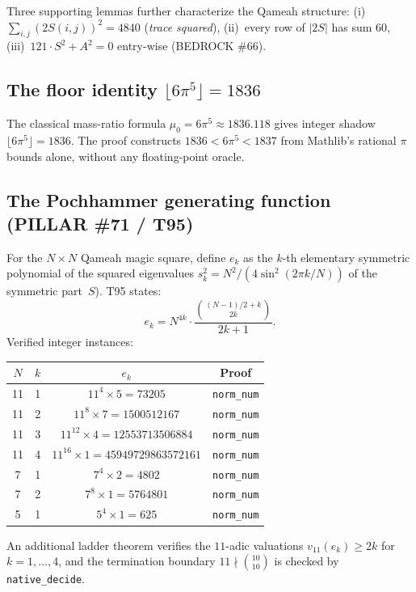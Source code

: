 \documentclass[11pt,a4paper]{article}
\begin{document}
Three supporting lemmas further characterize the Qameah structure:
(i)~$\sum_{i,j}(2S(i,j))^2 = 4840$ (\textit{trace squared}),
(ii)~every row of $|2S|$ has sum 60,
(iii)~$121\cdot S^2 + A^2 = 0$ entry-wise (BEDROCK \#66).

\subsection{The floor identity $\lfloor 6\pi^5\rfloor = 1836$}

The classical mass-ratio formula $\mu_0=6\pi^5\approx 1836.118$ gives
integer shadow $\lfloor 6\pi^5\rfloor = 1836$.  The proof constructs
$1836 < 6\pi^5 < 1837$ from Mathlib's rational $\pi$ bounds alone,
without any floating-point oracle.

\subsection{The Pochhammer generating function (PILLAR \#71 / T95)}

For the $N\times N$ Qameah magic square, define $e_k$ as the $k$-th
elementary symmetric polynomial of the
squared eigenvalues $s_k^2 = N^2/(4\sin^2(2\pi k/N))$ of the symmetric
part~$S$).  T95 states:
\[
  e_k = N^{4k}\cdot \frac{\binom{(N-1)/2+k}{2k}}{2k+1}.
\]
Verified integer instances:

\begin{center}
\begin{tabular}{cccc}
\toprule
$N$ & $k$ & $e_k$ & Proof \\
\midrule
11 & 1 & $11^4 \times 5 = 73205$ & \texttt{norm\_num} \\
11 & 2 & $11^8 \times 7 = 1500512167$ & \texttt{norm\_num} \\
11 & 3 & $11^{12}\times 4 = 12553713506884$ & \texttt{norm\_num} \\
11 & 4 & $11^{16}\times 1 = 45949729863572161$ & \texttt{norm\_num} \\
7  & 1 & $7^4 \times 2 = 4802$ & \texttt{norm\_num} \\
7  & 2 & $7^8 \times 1 = 5764801$ & \texttt{norm\_num} \\
5  & 1 & $5^4 \times 1 = 625$ & \texttt{norm\_num} \\
\bottomrule
\end{tabular}
\end{center}

An additional ladder theorem verifies the $11$-adic valuations
$v_{11}(e_k) \geq 2k$ for $k=1,\ldots,4$, and the termination
boundary $11\nmid \binom{10}{10}$ is checked by \texttt{native\_decide}.
\end{document}
